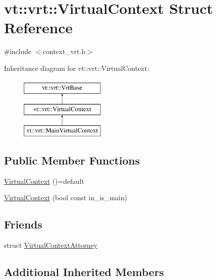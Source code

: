 \hypertarget{structvt_1_1vrt_1_1_virtual_context}{}\section{vt\+:\+:vrt\+:\+:Virtual\+Context Struct Reference}
\label{structvt_1_1vrt_1_1_virtual_context}


{\ttfamily \#include $<$context\+\_\+vrt.\+h$>$}

Inheritance diagram for vt\+:\+:vrt\+:\+:Virtual\+Context\+:\begin{figure}[H]
\begin{center}
\leavevmode
\includegraphics[height=3.000000cm]{structvt_1_1vrt_1_1_virtual_context}
\end{center}
\end{figure}
\subsection*{Public Member Functions}
\begin{DoxyCompactItemize}
\item 
\hyperlink{structvt_1_1vrt_1_1_virtual_context_a9958f214ea97abc63031ad1e02fffee8}{Virtual\+Context} ()=default
\item 
\hyperlink{structvt_1_1vrt_1_1_virtual_context_a8191db2145176e8ca47c38599adb0b57}{Virtual\+Context} (bool const in\+\_\+is\+\_\+main)
\end{DoxyCompactItemize}
\subsection*{Friends}
\begin{DoxyCompactItemize}
\item 
struct \hyperlink{structvt_1_1vrt_1_1_virtual_context_a3c098ac4f050b85316f4ae9eef22a43e}{Virtual\+Context\+Attorney}
\end{DoxyCompactItemize}
\subsection*{Additional Inherited Members}



